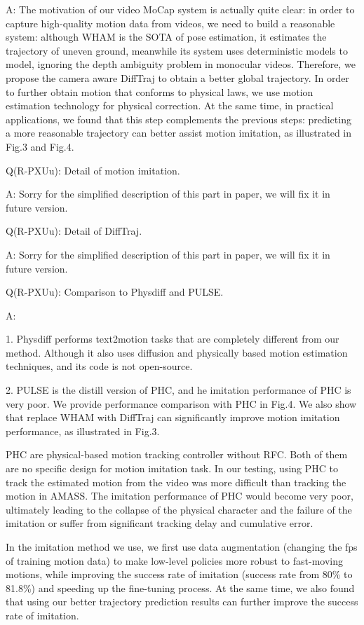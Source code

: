 \documentclass{article}
\begin{document}
A: The motivation of our video MoCap system is actually quite clear: in order to capture high-quality motion data from videos, we need to build a reasonable system: although WHAM is the SOTA of pose estimation, it estimates the trajectory of uneven ground, meanwhile its system uses deterministic models to model, ignoring the depth ambiguity problem in monocular videos. Therefore, we propose the camera aware DiffTraj to obtain a better global trajectory. In order to further obtain motion that conforms to physical laws, we use motion estimation technology for physical correction. At the same time, in practical applications, we found that this step complements the previous steps: predicting a more reasonable trajectory can better assist motion imitation, as illustrated in Fig.3 and Fig.4.

Q(R-PXUu): Detail of motion imitation.

A: Sorry for the simplified description of this part in paper, we will fix it in future version.

Q(R-PXUu): Detail of DiffTraj.

A: Sorry for the simplified description of this part in paper, we will fix it in future version.

Q(R-PXUu): Comparison to Physdiff and PULSE.

A: 

1. Physdiff performs text2motion tasks that are completely different from our method. Although it also uses diffusion and physically based motion estimation techniques, and its code is not open-source.

2. PULSE is the distill version of PHC, and he imitation performance of PHC is very poor. We provide performance comparison with PHC in Fig.4. We also show that replace WHAM with DiffTraj can significantly improve motion imitation performance, as illustrated in Fig.3.

PHC are physical-based motion tracking controller without RFC. Both of them are no specific design for motion imitation task. In our testing, using PHC to track the estimated motion from the video was more difficult than tracking the motion in AMASS. The imitation performance of PHC would become very poor, ultimately leading to the collapse of the physical character and the failure of the imitation or suffer from significant tracking delay and cumulative error.

In the imitation method we use, we first use data augmentation (changing the fps of training motion data) to make low-level policies more robust to fast-moving motions, while improving the success rate of imitation (success rate from 80\% to 81.8\%) and speeding up the fine-tuning process. At the same time, we also found that using our better trajectory prediction results can further improve the success rate of imitation. 
\end{document}
